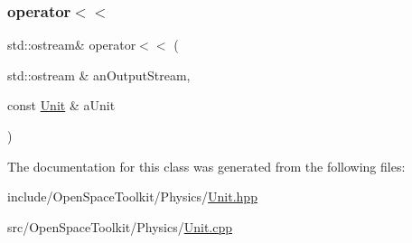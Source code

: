 \subsubsection{\texorpdfstring{operator$<$$<$}{operator<<}}
{\footnotesize\ttfamily std\+::ostream\& operator$<$$<$ (\begin{DoxyParamCaption}\item[{std\+::ostream \&}]{an\+Output\+Stream,  }\item[{const \hyperlink{classostk_1_1physics_1_1_unit}{Unit} \&}]{a\+Unit }\end{DoxyParamCaption})\hspace{0.3cm}{\ttfamily [friend]}}



The documentation for this class was generated from the following files\+:\begin{DoxyCompactItemize}
\item 
include/\+Open\+Space\+Toolkit/\+Physics/\hyperlink{_unit_8hpp}{Unit.\+hpp}\item 
src/\+Open\+Space\+Toolkit/\+Physics/\hyperlink{_unit_8cpp}{Unit.\+cpp}\end{DoxyCompactItemize}
